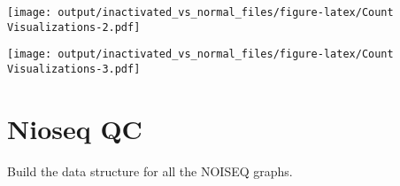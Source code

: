 \documentclass[]{article}
\newenvironment{Shaded}{\begin{snugshade}}{\end{snugshade}}
\newcommand{\KeywordTok}[1]{\textcolor[rgb]{0.13,0.29,0.53}{\textbf{#1}}}
\newcommand{\DataTypeTok}[1]{\textcolor[rgb]{0.13,0.29,0.53}{#1}}
\newcommand{\DecValTok}[1]{\textcolor[rgb]{0.00,0.00,0.81}{#1}}
\newcommand{\StringTok}[1]{\textcolor[rgb]{0.31,0.60,0.02}{#1}}
\newcommand{\OperatorTok}[1]{\textcolor[rgb]{0.81,0.36,0.00}{\textbf{#1}}}
\newcommand{\NormalTok}[1]{#1}
\begin{document}
\texttt{[image: output/inactivated\_vs\_normal\_files/figure-latex/Count Visualizations-2.pdf]}

\begin{Shaded}
\end{Shaded}

\texttt{[image: output/inactivated\_vs\_normal\_files/figure-latex/Count Visualizations-3.pdf]}

\section{Nioseq QC}\label{nioseq-qc}

Build the data structure for all the NOISEQ graphs.
\end{document}
